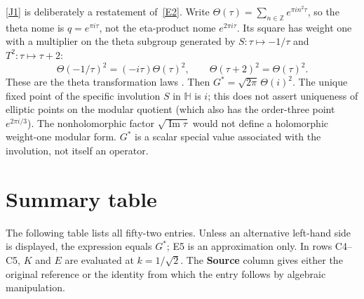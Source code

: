 \documentclass[12pt,reqno]{amsart}
\theoremstyle{definition}
\theoremstyle{remark}
\newcommand{\ZZ}{\mathbb{Z}}
\newcommand{\HH}{\mathbb{H}}
\newcommand{\Gstar}{G^{\!*}}
\begin{document}
\noindent
\eqref{J1} is deliberately a restatement of~\eqref{E2}.
Write $\Theta(\tau)=\sum_{n\in\ZZ}e^{\pi i n^2\tau}$, so the
theta nome is $q=e^{\pi i\tau}$, not the eta-product nome
$e^{2\pi i\tau}$. Its square has weight one with a multiplier on
the theta subgroup generated by $S:\tau\mapsto-1/\tau$ and
$T^2:\tau\mapsto\tau+2$:
\[
 \Theta(-1/\tau)^2=(-i\tau)\Theta(\tau)^2,\qquad
 \Theta(\tau+2)^2=\Theta(\tau)^2.
\]
These are the theta transformation laws \cite[20.7]{DLMF}.
Then $\Gstar=\sqrt{2\pi}\,\Theta(i)^2$.
The unique fixed point of the specific involution $S$ in $\HH$ is $i$;
this does not assert uniqueness of elliptic points on the modular
quotient (which also has the order-three point $e^{2\pi i/3}$).
The nonholomorphic factor $\sqrt{\operatorname{Im}\tau}$ would not
define a holomorphic weight-one modular form. $\Gstar$ is a scalar
special value associated with the involution, not itself an operator.


\clearpage
\section{Summary table}\label{sec:table}

The following table lists all fifty-two entries. Unless an alternative
left-hand side is displayed, the expression equals $\Gstar$; E5 is an
approximation only. In rows C4--C5, $K$ and $E$ are evaluated at
$k=1/\sqrt2$. The
\textbf{Source} column gives either the original reference or the
identity from which the entry follows by algebraic manipulation.
\end{document}
